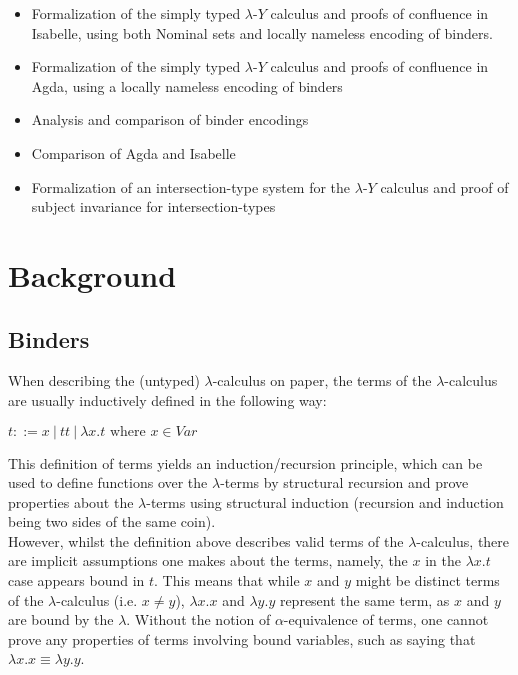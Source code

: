 \documentclass[a4paper, 12pt, twoside]{style/ociamthesis}
\theoremstyle{plain}
\theoremstyle{definition}
\theoremstyle{remark}
\providecommand{\tightlist}{%
  \setlength{\itemsep}{0pt}\setlength{\parskip}{0pt}}
\newcommand{\lamy}{\lambda\text{-}Y}
\begin{document}
\begin{itemize}
\tightlist
\item
  Formalization of the simply typed \(\lamy\) calculus and proofs of
  confluence in Isabelle, using both Nominal sets and locally nameless
  encoding of binders.
\item
  Formalization of the simply typed \(\lamy\) calculus and proofs of
  confluence in Agda, using a locally nameless encoding of binders
\item
  Analysis and comparison of binder encodings
\item
  Comparison of Agda and Isabelle
\item
  Formalization of an intersection-type system for the \(\lamy\)
  calculus and proof of subject invariance for intersection-types
\end{itemize}

\chapter{Background}\label{background}

\section{Binders}\label{binders}

\label{binders}

When describing the (untyped) \(\lambda\)-calculus on paper, the terms
of the \(\lambda\)-calculus are usually inductively defined in the
following way:

\begin{center}
$t::= x\ |\ tt\ |\ \lambda x.t \text{ where }x \in Var$
\end{center}

This definition of terms yields an induction/recursion principle, which
can be used to define functions over the \(\lambda\)-terms by structural
recursion and prove properties about the \(\lambda\)-terms using
structural induction (recursion and induction being two sides of the
same coin).\\
However, whilst the definition above describes valid terms of the
\(\lambda\)-calculus, there are implicit assumptions one makes about the
terms, namely, the \(x\) in the \(\lambda x.t\) case appears bound in
\(t\). This means that while \(x\) and \(y\) might be distinct terms of
the \(\lambda\)-calculus (i.e. \(x \neq y\)), \(\lambda x.x\) and
\(\lambda y.y\) represent the same term, as \(x\) and \(y\) are bound by
the \(\lambda\). Without the notion of \(\alpha\)-equivalence of terms,
one cannot prove any properties of terms involving bound variables, such
as saying that \(\lambda x.x \equiv \lambda y.y\).
\end{document}
